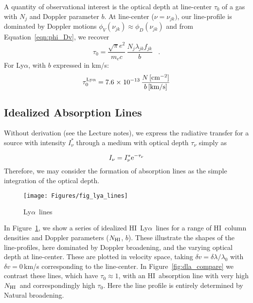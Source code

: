 \documentclass[graybox]{svmult}
\newcommand{\HI}{H{\sc I}}
\def\lya{Ly$\alpha$}
\def\sci#1{{\; \times \; 10^{#1}}}
\def\perd{\;\;\; .}
\def\rme{{\rm e}}
\newcommand{\mnhi}{N_{\rm HI}}
\newcommand{\nhi}{$\mnhi$}
\begin{document}
A quantity of observational interest is the 
optical depth at line-center $\tau_0$ of a gas with $N_j$
and Doppler parameter $b$.
At line-center ($\nu = \nu_{jk})$, our line-profile is 
dominated by Doppler motions
$\phi_V(\nu_{jk}) \approx \phi_D (\nu_{jk})$ and from 
Equation~\ref{eqn:phi_Dv}, we recover
\begin{equation}
\tau_0 =  \frac{\sqrt{\pi} e^2}{m_e c} \, \frac{N_j \lambda_{jk} f_{jk}}{b} \perd
\end{equation}
For Ly$\alpha$, with $b$ expressed in km/s:
\begin{equation}
\tau_0^{\rm Ly\alpha} =  7.6 \sci{-13} \, 
\frac{N \, [\rm cm^{-2}]}{b \, [\rm km/s]}
\label{eqn:tau0}
\end{equation}

\subsection{Idealized Absorption Lines}

Without derivation (see the Lecture notes),
we express the radiative transfer for a source with
intensity $I^*_\nu$ through a medium with
optical depth $\tau_\nu$ simply as

\begin{equation}
I_\nu = I_\nu^* \rme^{-\tau_\nu}
\end{equation}
Therefore, we may consider the formation of absorption lines as the 
simple integration of the optical depth.

%
\begin{figure}[b]
\texttt{[image: Figures/fig\_lya\_lines]}
%
%
\caption{\lya\ lines
}
\label{fig:lyalines}       %
\end{figure}


In Figure~\ref{fig:lyalines}, we show a series of idealized \HI\ \lya\
lines for a range of \HI\ column densities and Doppler parameters
(\nhi, $b$).  These illustrate the shapes of the line-profiles, here
dominated by Doppler broadening, and the varying optical depth
at line-center.  These are plotted in velocity space, taking
$\delta v = \delta \lambda / \lambda_0$ with 
$\delta v=0$\,km/s corresponding to the line-center.  
In Figure~\ref{fig:dla_compare}
we contrast these lines, which have $\tau_0 \approx 1$, with 
an \HI\ absorption line with very high \nhi\ and correspondingly
high $\tau_0$.  Here the line profile is entirely determined
by Natural broadening.
\end{document}
